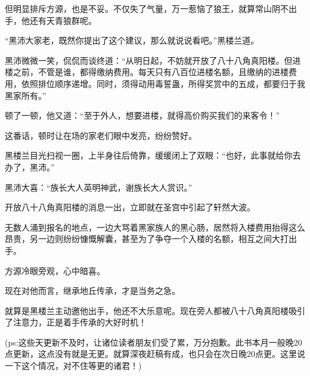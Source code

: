 \begin{this_body}
但明显排斥方源，也是不妥。不仅失了气量，万一惹恼了狼王，就算常山阴不出手，他还有天青狼群呢。

“黑沛大家老，既然你提出了这个建议，那么就说说看吧。”黑楼兰道。

黑沛微微一笑，侃侃而谈终道：“从明日起，不妨就开放了八十八角真阳楼。但进楼之前，不管是谁，都得缴纳费用。每天只有八百位进楼名额，且缴纳的进楼费用，依照排位顺序递增。同时，须得动用毒誓蛊，所得奖赏中的五成，都要归于我黑家所有。”

顿了一顿，他又道：“至于外人，想要进楼，就得高价购买我们的来客令！”

这番话，顿时让在场的家老们眼中发亮，纷纷赞好。

黑楼兰目光扫视一圈，上半身往后倚靠，缓缓闭上了双眼：“也好，此事就给你去办了，黑沛。”

黑沛大喜：“族长大人英明神武，谢族长大人赏识。”

开放八十八角真阳楼的消息一出，立即就在圣宫中引起了轩然大波。

无数人涌到报名的地点，一边大骂着黑家族人的黑心肠，居然将入楼费用抬得这么昂贵，另一边则纷纷慷慨解囊，甚至为了争夺一个入楼的名额，相互之间大打出手。

方源冷眼旁观，心中暗喜。

现在对他而言，继承地丘传承，才是当务之急。

就算是黑楼兰主动邀他出手，他还不大乐意呢。现在旁人都被八十八角真阳楼吸引了注意力，正是着手传承的大好时机！

(ps:这些天更新不及时，让诸位读者朋友们受了累，万分抱歉。此书本月一般晚20点更新，这点没有就是无更。就算深夜赶稿有成，也只会在次日晚20点更。这里说一下这个情况，对不住等更的诸君！)

\end{this_body}


